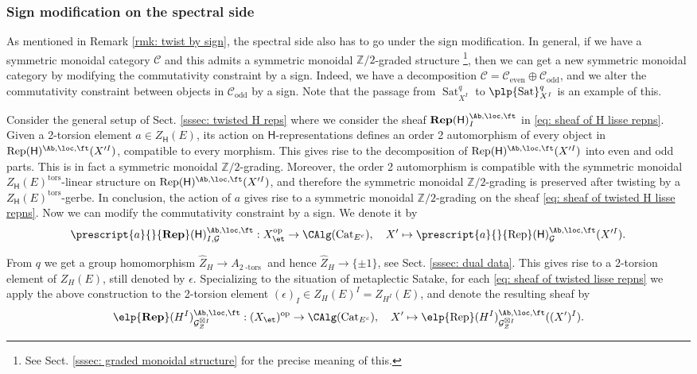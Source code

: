 \documentclass[10pt]{amsart}
\newcommand{\sssec}{\subsubsection}
\theoremstyle{remark}
\newcommand{\wh}{\widehat}
\newcommand{\Z}{\mathbb{Z}}
\newcommand{\on}{\operatorname}
\newcommand{\cC}{\mathcal{C}}
\newcommand{\cG}{\mathcal{G}}
\newcommand{\Cat}{\on{Cat}}
\newcommand{\CatEc}{\Cat_{E^c}}
\newcommand{\Rep}{\on{Rep}}
\newcommand{\Sat}{\on{Sat}}
\DeclareMathOperator{\op}{op}
\newcommand{\sffH}{\mathsf{H}}
\begin{document}
\sssec{Sign modification on the spectral side}\label{sssec: spectral sign}
As mentioned in Remark \ref{rmk: twist by sign}, the spectral side also has to go under the sign modification. In general, if we have a symmetric monoidal category $\cC$ and this admits a symmetric monoidal $\Z/2$-graded structure \footnote{See Sect. \ref{sssec: graded monoidal structure} for the precise meaning of this.}, then we can get a new symmetric monoidal category by modifying the commutativity constraint by a sign. Indeed, we have a decomposition $\cC=\cC_{\on{even}}\oplus \cC_{\on{odd}}$, and we alter the commutativity constraint between objects in $\cC_{\on{odd}}$ by a sign. Note that the passage from $\Sat^q_{X^I}$ to $\plp{\Sat}^q_{X^I}$ is an example of this.
\medskip

Consider the general setup of Sect. \ref{sssec: twisted H reps} where we consider the sheaf $\mathbf{Rep}(\sffH)^{\Ab,\loc,\ft}_I$ in \eqref{eq: sheaf of H lisse repns}. Given a 2-torsion element $a\in Z_{\sffH}(E)$, its action on $\sffH$-representations defines an order 2 automorphism of every object in $\Rep(\sffH)^{\Ab,\loc,\ft}(X'^I)$, compatible to every morphism. This gives rise to the decomposition of $\Rep(\sffH)^{\Ab,\loc,\ft}(X'^I)$ into even and odd parts. This is in fact a symmetric monoidal $\Z/2$-grading.
Moreover, the order 2 automorphism is compatible with the symmetric monoidal $Z_{\sffH}(E)^{\on{tors}}$-linear structure on $\Rep(\sffH)^{\Ab,\loc,\ft}(X'^I)$, and therefore the symmetric monoidal $\Z/2$-grading is preserved after twisting by a $Z_{\sffH}(E)^{\on{tors}}$-gerbe. In conclusion, the action of $a$ gives rise to a symmetric monoidal $\Z/2$-grading on the sheaf \eqref{eq: sheaf of twisted H lisse repns}. Now we can modify the commutativity constraint by a sign. We denote it by
\begin{equation}\label{eq: sheaf of twisted H lisse repns sgn}
 \prescript{a}{}{\mathbf{Rep}}(\mathsf{H})^{\Ab,\loc,\ft}_{I,\cG}:
    X_{\et}^{\op}\rightarrow \CAlg(\CatEc),\quad X'\mapsto \prescript{a}{}{\Rep}(\mathsf{H})^{\Ab,\loc,\ft}_{\cG}(X'^I).
\end{equation}

From $q$ we get a group homomorphism $\wh{Z}_H\rightarrow A_{2\on{-tors}}$ and hence $\wh{Z}_H\rightarrow \{\pm 1\}$, see Sect. \ref{sssec: dual data}. This gives rise to a 2-torsion element of $Z_H(E)$, still denoted by $\epsilon$.
Specializing to the situation of metaplectic Satake, for each \eqref{eq: sheaf of twisted lisse repns} we apply the above construction to the 2-torsion element $(\epsilon)_I\in Z_H(E)^I=Z_{H^I}(E)$, and denote the resulting sheaf by
\begin{equation}\label{eq: sheaf of twisted lisse repns sgn}
\elp{\mathbf{Rep}}(H^I)^{\Ab,\loc,\ft}_{\cG^{\boxtimes I}_Z}: (X_{\et})^{\op}\rightarrow \CAlg(\CatEc),\quad X'\mapsto \elp{\Rep}(H^I)^{\Ab,\loc,\ft}_{\cG_Z^{\boxtimes I}}((X')^I).
\end{equation}
\end{document}

